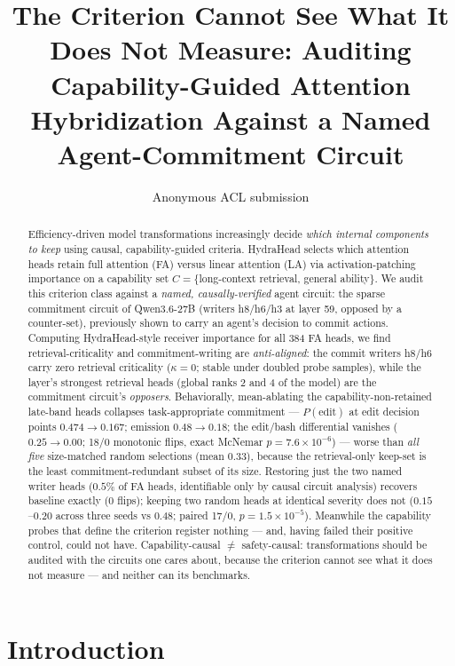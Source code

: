 \documentclass[11pt]{article}
\title{The Criterion Cannot See What It Does Not Measure: Auditing Capability-Guided Attention Hybridization Against a Named Agent-Commitment Circuit}
\author{Anonymous ACL submission}
\begin{document}
\maketitle
\begin{abstract}
Efficiency-driven model transformations increasingly decide \emph{which internal components to keep} using
causal, capability-guided criteria. HydraHead \citep{tan2026hydrahead} selects which attention heads retain
full attention (FA) versus linear attention (LA) via activation-patching importance on a capability set
$C=\{$long-context retrieval, general ability$\}$. We audit this criterion class against a \emph{named,
causally-verified} agent circuit: the sparse commitment circuit of Qwen3.6-27B (writers h8/h6/h3 at layer
59, opposed by a counter-set), previously shown to carry an agent's decision to commit actions. Computing
HydraHead-style receiver importance for all 384 FA heads, we find retrieval-criticality and
commitment-writing are \emph{anti-aligned}: the commit writers h8/h6 carry zero retrieval criticality
($\kappa{=}0$; stable under doubled probe samples), while the layer's strongest retrieval heads (global
ranks 2 and 4 of the model) are the commitment circuit's \emph{opposers}. Behaviorally, mean-ablating the
capability-non-retained late-band heads collapses task-appropriate commitment --- $P(\text{edit})$ at edit
decision points $0.474{\to}0.167$; emission $0.48{\to}0.18$; the edit/bash differential vanishes
($0.25{\to}0.00$; 18/0 monotonic flips, exact McNemar $p{=}7.6{\times}10^{-6}$) --- worse than \emph{all
five} size-matched random selections (mean $0.33$), because the retrieval-only keep-set is the least
commitment-redundant subset of its size. Restoring just the two named writer heads ($0.5\%$ of FA heads,
identifiable only by causal circuit analysis) recovers baseline exactly (0 flips); keeping two random heads
at identical severity does not ($0.15$--$0.20$ across three seeds vs $0.48$; paired 17/0,
$p{=}1.5{\times}10^{-5}$). Meanwhile the capability
probes that define the criterion register nothing --- and, having failed their positive control, could
not have. Capability-causal $\neq$ safety-causal: transformations should be audited with the circuits one
cares about, because the criterion cannot see what it does not measure --- and neither can its benchmarks.
\end{abstract}

\section{Introduction}
\end{document}
